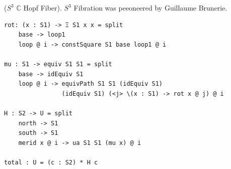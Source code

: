 \documentclass{article}
\begin{document}

\newpage
\begin{example} ($S^3$ $\mathbb{C}$  Hopf Fiber).
$S^3$ Fibration was peeoneered by Guillaume Brunerie.
\begin{lstlisting}
rot: (x : S1) -> Ξ S1 x x = split
    base -> loop1
    loop @ i -> constSquare S1 base loop1 @ i

mu : S1 -> equiv S1 S1 = split
    base -> idEquiv S1
    loop @ i -> equivPath S1 S1 (idEquiv S1)
                (idEquiv S1) (<j> \(x : S1) -> rot x @ j) @ i

H : S2 -> U = split
    north -> S1
    south -> S1
    merid x @ i -> ua S1 S1 (mu x) @ i

total : U = (c : S2) * H c
\end{lstlisting}
\end{example}

\end{document}
